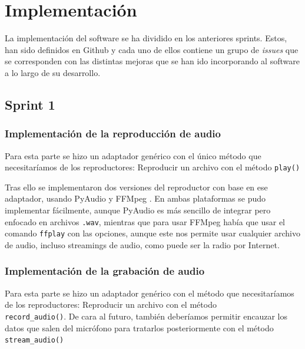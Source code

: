 \chapter{Implementación}

\noindent{}
\newline

La implementación del software se ha dividido en los anteriores sprints. Estos, han sido definidos en Github
y cada uno de ellos contiene un grupo de \textit{issues} que se corresponden con las distintas
mejoras que se han ido incorporando al software a lo largo de su desarrollo.\\

\section{Sprint 1}
\subsection{Implementación de la reproducción de audio}
Para esta parte se hizo un adaptador genérico con el único método que necesitaríamos
de los reproductores: Reproducir un archivo con el método \texttt{play()}

Tras ello se implementaron dos versiones del reproductor con base en ese adaptador,
usando PyAudio \cite{pyaudio} y FFMpeg \cite{ffmpeg}. En ambas plataformas se pudo implementar fácilmente, aunque PyAudio es más sencillo de integrar pero enfocado en archivos \texttt{.wav}, mientras que para usar FFMpeg había que usar el comando \texttt{ffplay} con las opciones, aunque este nos permite usar cualquier archivo de audio, incluso streamings de audio, como puede ser la radio por Internet.

\subsection{Implementación de la grabación de audio}
Para esta parte se hizo un adaptador genérico con el método que necesitaríamos
de los reproductores: Reproducir un archivo con el método \\ \texttt{record\_audio()}. De cara al futuro, también deberíamos permitir encauzar los datos que salen del micrófono para tratarlos posteriormente con el método \texttt{stream\_audio()}

